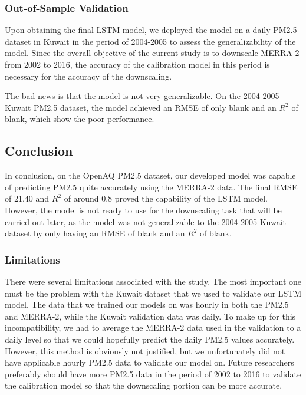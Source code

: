 \documentclass[draft]{agujournal2019}
\begin{document}
\subsubsection{Out-of-Sample Validation}

Upon obtaining the final LSTM model, we deployed the model on a daily PM2.5 dataset in Kuwait in the period of 2004-2005 to assess the generalizability of the model. Since the overall objective of the current study is to downscale MERRA-2 from 2002 to 2016, the accuracy of the calibration model in this period is necessary for the accuracy of the downscaling.

The bad news is that the model is not very generalizable. On the 2004-2005 Kuwait PM2.5 dataset, the model achieved an RMSE of only {blank} and an \( R^2 \) of {blank}, which show the poor performance.

\subsection{Conclusion}

In conclusion, on the OpenAQ PM2.5 dataset, our developed model was capable of predicting PM2.5 quite accurately using the MERRA-2 data. The final RMSE of 21.40 and \( R^2 \) of around 0.8 proved the capability of the LSTM model. However, the model is not ready to use for the downscaling task that will be carried out later, as the model was not generalizable to the 2004-2005 Kuwait dataset by only having an RMSE of {blank} and an \( R^2 \) of {blank}.

\subsubsection{Limitations}

There were several limitations associated with the study. The most important one must be the problem with the Kuwait dataset that we used to validate our LSTM model. The data that we trained our models on was hourly in both the PM2.5 and MERRA-2, while the Kuwait validation data was daily. To make up for this incompatibility, we had to average the MERRA-2 data used in the validation to a daily level so that we could hopefully predict the daily PM2.5 values accurately. However, this method is obviously not justified, but we unfortunately did not have applicable hourly PM2.5 data to validate our model on. Future researchers preferably should have more PM2.5 data in the period of 2002 to 2016 to validate the calibration model so that the downscaling portion can be more accurate.
\end{document}
